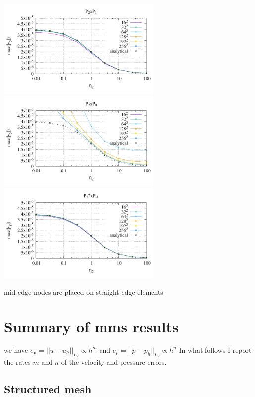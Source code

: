 \begin{center}
\includegraphics[width=8cm]{python_codes/fieldstone_120/paperresults/rt/structured/rt_wave_vel_P2P1.pdf}\\
\includegraphics[width=8cm]{python_codes/fieldstone_120/paperresults/rt/structured/rt_wave_vel_P2P0.pdf}
\includegraphics[width=8cm]{python_codes/fieldstone_120/paperresults/rt/structured/rt_wave_vel_P2+P-1.pdf} 
\end{center}

mid edge nodes are placed on straight edge elements


\newpage
\section{Summary of mms results}


we have $e_{\bm u}=||u-u_h||_{L_2} \propto h^m$ and $e_p=||p-p_h||_{L_2} \propto h^n$
In what follows I report the rates $m$ and $n$ of the velocity and pressure errors.

\subsection*{Structured mesh}

